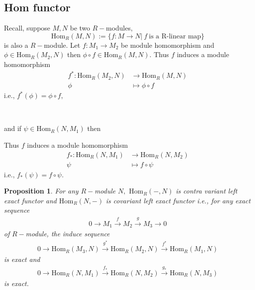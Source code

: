 \documentclass[11pt]{amsart}
\newtheorem{proposition}[theorem]{Proposition}%
\newcommand{\Hom}[1]{\text{Hom}_R\left(#1\right)}
\begin{document}
\subsection{Hom functor}

Recall, suppose $M,N$ be two $R-$modules, $$\Hom{M,N}:=\{f:M\to N|~f~\text{is a R-linear map}\}$$ is also a $R-$module. Let $f:M_1\to M_2$ be module homomorphism and $\phi\in \Hom{M_2,N}$ then $\phi \circ f\in \Hom{M,N}.$ Thus $f$ induces a module homomorphism\begin{align*}
f^*:\Hom{M_2,N}&\to \Hom{M,N}\\
\phi&\mapsto \phi\circ f
\end{align*} i.e., $f^*(\phi)=\phi\circ f,$
\begin{center}
 \\
\end{center}
 and if $\psi\in \Hom{N,M_1}$ then \begin{center}
\end{center}
Thus $f$ induces a module homomorphism \begin{align*}
f_*:\Hom{N,M_1}&\to \Hom{N,M_2}\\
\psi&\mapsto f\circ \psi
\end{align*}
i.e., $f_*(\psi)=f\circ \psi.$
\begin{proposition}
For any $R-$module $N,$ $\Hom{-,N}$ is contra variant left exact functor and $\Hom{N,-}$ is covariant left exact functor i.e., for any exact sequence \begin{align}
0\longrightarrow M_1\stackrel{f}{\longrightarrow} M_2\stackrel{g}{\longrightarrow}M_3\longrightarrow 0
\end{align} of $R-$module, the induce sequence \begin{align}
0\longrightarrow \Hom{M_3,N}\stackrel{g^*}{\longrightarrow}\Hom{M_2,N}\stackrel{f^*}{\longrightarrow}\Hom{M_1,N}
\end{align}
is exact and \begin{align}
0\longrightarrow \Hom{N,M_1}\stackrel{f_*}{\longrightarrow}\Hom{N,M_2}\stackrel{g_*}{\longrightarrow}\Hom{N,M_3}
\end{align}
is exact.
\end{proposition}
\end{document}
